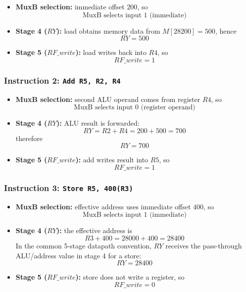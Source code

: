 \documentclass[12pt,a4paper]{article}
\begin{document}
\begin{itemize}[leftmargin=2em]
    \item \textbf{MuxB selection:} immediate offset \(200\), so
    \[
    \boxed{\text{MuxB selects input 1 (immediate)}}
    \]
    \item \textbf{Stage 4 (\(RY\)):} load obtains memory data from \(M[28200]=500\), hence
    \[
    \boxed{RY=500}
    \]
    \item \textbf{Stage 5 (\(RF\_write\)):} load writes back into \(R4\), so
    \[
    \boxed{RF\_write=1}
    \]
\end{itemize}

\subsubsection*{Instruction 2: \texttt{Add R5, R2, R4}}

\begin{itemize}[leftmargin=2em]
    \item \textbf{MuxB selection:} second ALU operand comes from register \(R4\), so
    \[
    \boxed{\text{MuxB selects input 0 (register operand)}}
    \]
    \item \textbf{Stage 4 (\(RY\)):} ALU result is forwarded:
    \[
    RY = R2+R4 = 200+500=700
    \]
    therefore
    \[
    \boxed{RY=700}
    \]
    \item \textbf{Stage 5 (\(RF\_write\)):} add writes result into \(R5\), so
    \[
    \boxed{RF\_write=1}
    \]
\end{itemize}

\subsubsection*{Instruction 3: \texttt{Store R5, 400(R3)}}

\begin{itemize}[leftmargin=2em]
    \item \textbf{MuxB selection:} effective address uses immediate offset \(400\), so
    \[
    \boxed{\text{MuxB selects input 1 (immediate)}}
    \]
    \item \textbf{Stage 4 (\(RY\)):} the effective address is
    \[
    R3+400 = 28000+400=28400
    \]
    In the common 5-stage datapath convention, \(RY\) receives the pass-through ALU/address value in stage 4 for a store:
    \[
    \boxed{RY=28400}
    \]
    \item \textbf{Stage 5 (\(RF\_write\)):} store does not write a register, so
    \[
    \boxed{RF\_write=0}
    \]
\end{itemize}
\end{document}
